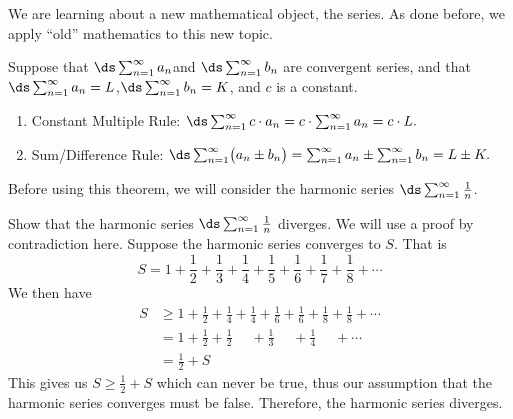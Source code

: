 We are learning about a new mathematical object, the series. As done before, we apply ``old'' mathematics to this new topic.

\begin{theorem}\label{thm:series_prop}
Suppose that \quad$\ds \sum_{n=1}^\infty a_n$\quad and \quad $\ds\sum_{n=1}^\infty b_n$ are convergent series, and that \quad$\ds \sum_{n=1}^\infty a_n = L$,\quad  $\ds\sum_{n=1}^\infty b_n = K$, and $c$ is a constant.
\begin{enumerate}
\item  Constant Multiple Rule: $\ds\sum_{n=1}^\infty c\cdot a_n = c\cdot\sum_{n=1}^\infty a_n = c\cdot L.$
\item		Sum/Difference Rule: $\ds\sum_{n=1}^\infty \bigl(a_n\pm b_n\bigr) = \sum_{n=1}^\infty a_n \pm \sum_{n=1}^\infty b_n = L \pm K.$
\end{enumerate}
\end{theorem}

Before using this theorem, we will consider the harmonic series $\ds\sum_{n=1}^\infty\frac1n$.

\begin{example}\label{ex_harm_series}
Show that the harmonic series $\ds \sum_{n=1}^\infty\frac1n$ diverges.
\solution
We will use a proof by contradiction here. Suppose the harmonic series converges to $S$. That is
\[S=1+\frac12+ \frac13 +\frac14+\frac15+\frac16+\frac17+\frac18+\dotsb\]
We then have
\begin{align*}
S &\geq 1+\frac12+\frac14+\frac14+\frac16+\frac16+\frac18+\frac18+\dotsb\\
&=1+\frac12+\frac12\phantom{+\frac14}+\frac13\phantom{+\frac16}
+\frac14\phantom{+\frac18}+\dotsb\\
&=\frac12+S
\end{align*}
This gives us $S\geq \frac12+S$ which can never be true, thus our assumption that the harmonic series converges must be false. Therefore, the harmonic series diverges.
\end{example}

